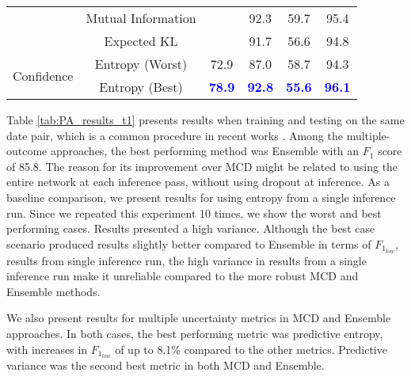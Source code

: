 \begin{table*}[ht!]
\begin{tabular}{c|c|c|ccc}
                            & Mutual Information          &                                & 92.3            & 59.7             & 95.4              \\
                            & Expected KL                 &                                & 91.7            & 56.6             & 94.8              \\ \hline
\multirow{2}{*}{Confidence} & Entropy (Worst)             & 72.9                           & 87.0            & 58.7             & 94.3              \\
                            & Entropy (Best)              & \textcolor{blue}{\textbf{78.9}}                           & \textcolor{blue}{\textbf{92.8}}            & \textcolor{blue}{\textbf{55.6}}             & \textcolor{blue}{\textbf{96.1}}              \\ \hline
\end{tabular}
\label{tab:MT_results_t0}
\end{table*}
 Table \ref{tab:PA_results_t1} presents results when training and testing on the same date pair, which is a common procedure in recent works \cite{ortega2021comparison}. Among the multiple-outcome approaches, the best performing method was Ensemble with an $F_1$ score of 85.8. The reason for its improvement over MCD might be related to using the entire network at each inference pass, without using dropout at inference. As a baseline comparison, we present results for using entropy from a single inference run. Since we repeated this experiment 10 times, we show the worst and best performing cases. Results presented a high variance. Although the best case scenario produced results slightly better compared to Ensemble in terms of $F_{1_{low}}$, results from single inference run, the high variance in results from a single inference run make it unreliable compared to the more robust MCD and Ensemble methods.

We also present results for multiple uncertainty metrics in MCD and Ensemble approaches. In both cases, the best performing metric was predictive entropy, with increases in $F_{1_{low}}$ of up to 8.1\% compared to the other metrics. Predictive variance was the second best metric in both MCD and Ensemble. 


